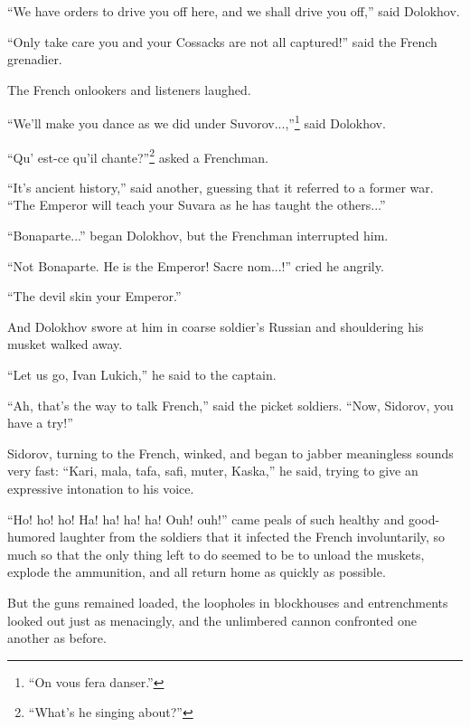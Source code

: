 ``We have orders to drive you off here, and we shall drive you
off,'' said Dolokhov.

``Only take care you and your Cossacks are not all captured!''
said the French grenadier.

The French onlookers and listeners laughed.

``We'll make you dance as we did under
Suvorov...,''\footnote{``On vous fera danser.''} said Dolokhov.

``Qu' est-ce qu'il chante?''\footnote{ ``What's he singing
about?''} asked a Frenchman.

``It's ancient history,'' said another, guessing that it referred
to a former war. ``The Emperor will teach your Suvara as he has
taught the others...''

``Bonaparte...'' began Dolokhov, but the Frenchman interrupted
him.

``Not Bonaparte. He is the Emperor! Sacre nom...!'' cried he
angrily.

``The devil skin your Emperor.''

And Dolokhov swore at him in coarse soldier's Russian and
shouldering his musket walked away.

``Let us go, Ivan Lukich,'' he said to the captain.

``Ah, that's the way to talk French,'' said the picket
soldiers. ``Now, Sidorov, you have a try!''

Sidorov, turning to the French, winked, and began to jabber
meaningless sounds very fast: ``Kari, mala, tafa, safi, muter,
Kaska,'' he said, trying to give an expressive intonation to his
voice.

``Ho! ho! ho! Ha! ha! ha! ha! Ouh! ouh!'' came peals of such
healthy and good-humored laughter from the soldiers that it
infected the French involuntarily, so much so that the only thing
left to do seemed to be to unload the muskets, explode the
ammunition, and all return home as quickly as possible.

But the guns remained loaded, the loopholes in blockhouses and
entrenchments looked out just as menacingly, and the unlimbered
cannon confronted one another as before.


